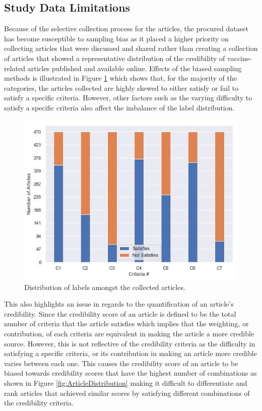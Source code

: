 \documentclass[a4paper,twoside,phd]{BYUPhys}
\begin{document}
\subsection{Study Data Limitations}
\label{sec:StudyDataLimitations}
Because of the selective collection process for the articles, the procured dataset has become susceptible to sampling bias as it placed a higher priority on collecting articles that were discussed and shared rather than creating a collection of articles that showed a representative distribution of the credibility of vaccine-related articles published and available online. Effects of the biased sampling methods is illustrated in Figure \ref{fig:LabelDistribution} which shows that, for the majority of the categories, the articles collected are highly skewed to either satisfy or fail to satisfy a specific criteria. However, other factors such as the varying difficulty to satisfy a specific criteria also affect the imbalance of the label distribution.


\begin{figure}[H]
	\centering
	\includegraphics[totalheight=6cm]{images/label-distribution.png}
	\caption{Distribution of labels amongst the collected articles.}
	\label{fig:LabelDistribution}
\end{figure}

This also highlights an issue in regards to the quantification of an article's credibility. Since the credibility score of an article is defined to be the total number of criteria that the article satisfies which implies that the weighting, or contribution, of each criteria are equivalent in making the article a more credible source. However, this is not reflective of the credibility criteria as the difficulty in satisfying a specific criteria, or its contribution in making an article more credible varies between each one. This causes the credibility score of an article to be biased towards credibility scores that have the highest number of combinations as shown in Figure \ref{fig:ArticleDistribution} making it difficult to differentiate and rank articles that achieved similar scores by satisfying different combinations of the credibility criteria.
\end{document}
